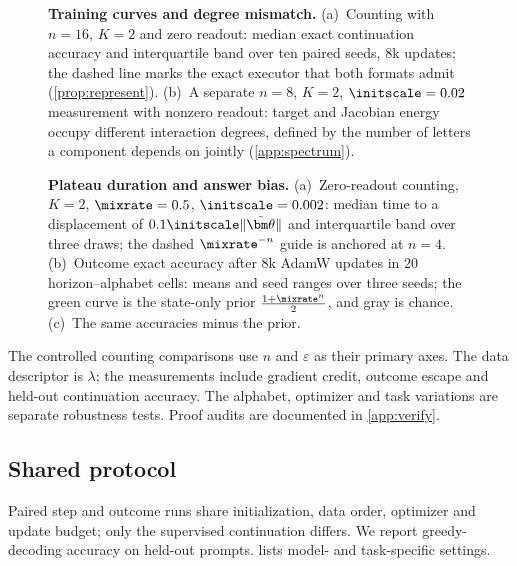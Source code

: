 \begin{figure}[H]
\centering

\caption{\textbf{Training curves and degree mismatch.}
(a)~Counting with $n=16$, $K=2$ and zero readout: median exact continuation accuracy and interquartile band over ten paired seeds, $8$k
updates; the dashed line marks the exact executor that both formats admit (\cref{prop:represent}).
(b)~A separate $n=8$, $K=2$, $\initscale=0.02$ measurement with nonzero readout: target and Jacobian energy occupy different interaction degrees, defined by the number of letters a component depends on jointly (\cref{app:spectrum}).}
\label{fig:overview}
\end{figure}

\begin{figure}[H]
\centering
\resizebox{\linewidth}{!}{}
\caption{\textbf{Plateau duration and answer bias.}
(a)~Zero-readout counting, $K=2$, $\mixrate=0.5$, $\initscale=0.002$: median time to a displacement of $0.1\initscale\|\tilde{\bm\theta}\|$ and interquartile band over three draws; the dashed $\mixrate^{-n}$ guide is anchored at $n=4$.
(b)~Outcome exact accuracy after $8$k AdamW updates in $20$ horizon--alphabet cells: means and seed ranges over three seeds; the green curve is the state-only prior $\frac{1+\mixrate^n}{2}$, and gray is chance.
(c)~The same accuracies minus the prior.}
\label{fig:theory-measurement}
\label{fig:lambda-grid}
\end{figure}

The controlled counting comparisons use $n$ and $\varepsilon$ as their primary
axes. The data descriptor is $\lambda$; the measurements include gradient credit,
outcome escape and held-out continuation accuracy.
The alphabet, optimizer and task variations are separate robustness tests.
Proof audits are documented in \cref{app:verify}.

\subsection{Shared protocol}
\label{app:letter-protocol}
Paired step and outcome runs share initialization, data order, optimizer and update budget; only the supervised continuation differs.
We report greedy-decoding accuracy on held-out prompts.  lists model- and task-specific settings.

